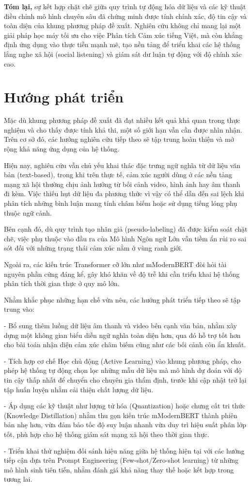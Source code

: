 \textbf{Tóm lại,} sự kết hợp chặt chẽ giữa quy trình tự động hóa dữ liệu và các kỹ thuật điều chỉnh mô hình chuyên sâu đã chứng minh được tính chính xác, độ tin cậy và toàn diện của khung phương pháp đề xuất. Nghiên cứu không chỉ mang lại một giải pháp học máy tối ưu cho việc Phân tích Cảm xúc tiếng Việt, mà còn khẳng định ứng dụng vào thực tiễn mạnh mẽ, tạo nền tảng để triển khai các hệ thống lắng nghe xã hội (social listening) và giám sát dư luận tự động với độ chính xác cao.

\section{Hướng phát triển}

Mặc dù khung phương pháp đề xuất đã đạt nhiều kết quả khả quan trong thực nghiệm và cho thấy được tính khả thi, một số giới hạn vẫn cần được nhìn nhận. Trên cơ sở đó, các hướng nghiên cứu tiếp theo sẽ tập trung hoàn thiện và mở rộng khả năng ứng dụng của hệ thống.

Hiện nay, nghiên cứu vẫn chủ yếu khai thác đặc trưng ngữ nghĩa từ dữ liệu văn bản (text-based), trong khi trên thực tế, cảm xúc người dùng ở các nền tảng mạng xã hội thường chịu ảnh hưởng từ bối cảnh video, hình ảnh hay âm thanh đi kèm. Việc thiếu hụt dữ liệu đa phương thức vì vậy có thể dẫn đến sai lệch khi phân tích những bình luận mang tính châm biếm hoặc sử dụng tiếng lóng phụ thuộc ngữ cảnh.

Bên cạnh đó, dù quy trình tạo nhãn giả (pseudo-labeling) đã được kiểm soát chặt chẽ, việc phụ thuộc vào đầu ra của Mô hình Ngôn ngữ Lớn vẫn tiềm ẩn rủi ro sai sót đối với những trạng thái cảm xúc nằm ở vùng ranh giới.

Ngoài ra, các kiến trúc Transformer cỡ lớn như mModernBERT đòi hỏi tài nguyên phần cứng đáng kể, gây khó khăn về độ trễ khi cần triển khai hệ thống phân tích thời gian thực ở quy mô lớn.

Nhằm khắc phục những hạn chế vừa nêu, các hướng phát triển tiếp theo sẽ tập trung vào:

- Bổ sung thêm luồng dữ liệu âm thanh và video bên cạnh văn bản, nhằm xây dựng một không gian biểu diễn ngữ nghĩa toàn diện hơn, qua đó hỗ trợ tốt hơn cho bài toán nhận diện cảm xúc châm biếm cũng như các bối cảnh còn ẩn khuất.

- Tích hợp cơ chế Học chủ động (Active Learning) vào khung phương pháp, cho phép hệ thống tự động chọn lọc những mẫu dữ liệu mà mô hình dự đoán với độ tin cậy thấp nhất để chuyển cho chuyên gia thẩm định, trước khi cập nhật trở lại tập huấn luyện nhằm cải thiện chất lượng dữ liệu.

- Áp dụng các kỹ thuật như lượng tử hóa (Quantization) hoặc chưng cất tri thức (Knowledge Distillation) nhằm thu gọn kiến trúc mModernBERT thành phiên bản nhẹ hơn, vừa đảm bảo tốc độ suy luận nhanh vừa duy trì hiệu suất phân lớp tốt, phù hợp cho hệ thống giám sát mạng xã hội theo thời gian thực.

- Triển khai thử nghiệm đối sánh hiệu năng giữa hệ thống hiện tại với các hướng tiếp cận dựa trên Prompt Engineering (Few-shot/Zero-shot learning) từ những mô hình sinh tiên tiến, nhằm đánh giá khả năng thay thế hoặc kết hợp trong tương lai.
